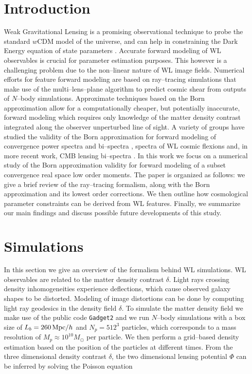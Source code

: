 \documentclass[reprint,aps,prd,superscriptaddress,showkeys,showpacs]{revtex4-1}
\newcommand{\ttt}[1]{\texttt{#1}}
\begin{document}
\section{Introduction}
%
Weak Gravitational Lensing is a promising observational technique to probe the standard $w$CDM model of the universe, and can help in constraining the Dark Energy equation of state parameters \citep{wlreview}. Accurate forward modeling of WL observables is crucial for parameter estimation purposes. This however is a challenging problem due to the non--linear nature of WL image fields. Numerical efforts for feature forward modeling are based on ray--tracing simulations that make use of the multi--lens--plane algorithm \citep{RayTracingJain,RayTracingHartlap} to predict cosmic shear from outputs of $N$--body simulations. Approximate techniques based on the Born approximation allow for a computationally cheaper, but potentially inaccurate, forward modeling \citep{RayTracingHartlap} which requires only knowledge of the matter density contrast integrated along the observer unperturbed line of sight. A variety of groups have studied the validity of the Born approximation for forward modeling of convergence power spectra and bi--spectra \citep{WLBispectrumDodelson}, spectra of WL cosmic flexions \citep{BornFlexion} and, in more recent work, CMB lensing bi--spectra \citep{CMBPrattenLewis}. In this work we focus on a numerical study of the Born approximation validity for forward modeling of a subset convergence real space low order moments. The paper is organized as follows: we give a brief review of the ray--tracing formalism, along with the Born approximation and its lowest order corrections. We then outline how cosmological parameter constraints can be derived from WL features. Finally, we summarize our main findings and discuss possible future developments of this study.       


\section{Simulations}
% 
In this section we give an overview of the formalism behind WL simulations. WL observables are related to the matter density contrast $\delta$. Light rays crossing density inhomogeneities experience deflections, which cause observed galaxy shapes to be distorted. Modeling of image distortions can be done by computing light ray geodesics in the density field $\delta$. To simulate the matter density field we make use of the public code \ttt{Gadget2} \citep{Gadget2} and we run $N$--body simulations with a box size of $L_b=260\,{\rm Mpc}/h$ and $N_p=512^3$ particles, which corresponds to a mass resolution of $M_p\approx 10^{10}M_\odot$ per particle. We then perform a grid--based density estimation based on the position of the particles at different times. From the three dimensional density contrast $\delta$, the two dimensional lensing potential $\Phi$ can be inferred by solving the Poisson equation 
\end{document}
